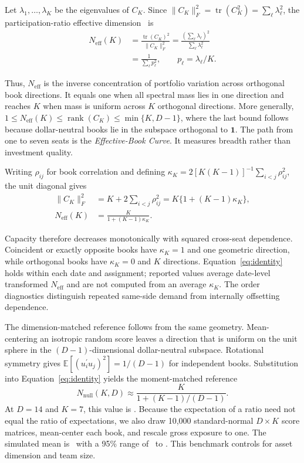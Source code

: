 \documentclass[sigconf]{acmart}
\begin{document}
Let $\lambda_1,\ldots,\lambda_K$ be the eigenvalues of $C_K$. Since $\lVert C_K\rVert_F^2=\operatorname{tr}(C_K^2)=\sum_{\ell}\lambda_\ell^2$, the participation-ratio effective dimension~\cite{mazzucato2016dimensionality} is
\begin{align}
N_{\mathrm{eff}}(K)
&=\frac{\operatorname{tr}(C_K)^2}{\lVert C_K\rVert_F^2}
 =\frac{(\sum_{\ell}\lambda_\ell)^2}{\sum_{\ell}\lambda_\ell^2}\\
&=\frac{1}{\sum_{\ell}p_\ell^2},
\qquad p_\ell=\lambda_\ell/K.\label{eq:neff}
\end{align}

Thus, $N_{\mathrm{eff}}$ is the inverse concentration of portfolio variation across orthogonal book directions. It equals one when all spectral mass lies in one direction and reaches $K$ when mass is uniform across $K$ orthogonal directions. More generally,
$1\leq N_{\mathrm{eff}}(K)\leq\operatorname{rank}(C_K)\leq\min\{K,D-1\}$,
where the last bound follows because dollar-neutral books lie in the subspace orthogonal to $\mathbf{1}$. The path from one to seven seats is the \emph{Effective-Book Curve}. It measures breadth rather than investment quality.

Writing $\rho_{ij}$ for book correlation and defining
$\kappa_K=2[K(K-1)]^{-1}\sum_{i<j}\rho_{ij}^2$, the unit diagonal gives
\begin{align}
\lVert C_K\rVert_F^2
&=K+2\sum_{i<j}\rho_{ij}^2
 =K\{1+(K-1)\kappa_K\},\\
N_{\mathrm{eff}}(K)
&=\frac{K}{1+(K-1)\kappa_K}.\label{eq:identity}
\end{align}

Capacity therefore decreases monotonically with squared cross-seat dependence. Coincident or exactly opposite books have $\kappa_K=1$ and one geometric direction, while orthogonal books have $\kappa_K=0$ and $K$ directions. Equation~\eqref{eq:identity} holds within each date and assignment; reported values average date-level transformed $N_{\mathrm{eff}}$ and are not computed from an average $\kappa_K$. The order diagnostics distinguish repeated same-side demand from internally offsetting dependence.

The dimension-matched reference follows from the same geometry. Mean-centering an isotropic random score leaves a direction that is uniform on the unit sphere in the $(D-1)$-dimensional dollar-neutral subspace. Rotational symmetry gives
$\mathbb{E}[(u_i^{\prime}u_j)^2]=1/(D-1)$ for independent books. Substitution into Equation~\eqref{eq:identity} yields the moment-matched reference
\begin{equation}
N_{\mathrm{null}}(K,D)\approx\frac{K}{1+(K-1)/(D-1)}.
\end{equation}
At $D=14$ and $K=7$, this value is \AnalyticNullKSeven. Because the expectation of a ratio need not equal the ratio of expectations, we also draw 10,000 standard-normal $D\times K$ score matrices, mean-center each book, and rescale gross exposure to one. The simulated mean is \NullKSeven\ with a 95\% range of \NullKSevenLow\ to \NullKSevenHigh. This benchmark controls for asset dimension and team size.
\end{document}
